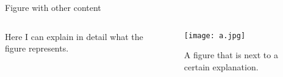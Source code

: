 \begin{frame}{Figure with other content}

    \begin{columns}
    \begin{column}{0.5\textwidth}
            Here I can explain in detail what the figure represents.
    \end{column}
    
    \begin{column}{0.5\textwidth}
        \begin{figure}
        \centering
            \texttt{[image: a.jpg]}
            \caption{A figure that is next to a certain explanation.}
        \end{figure}
    \end{column}
    
    \end{columns}
    
\end{frame}